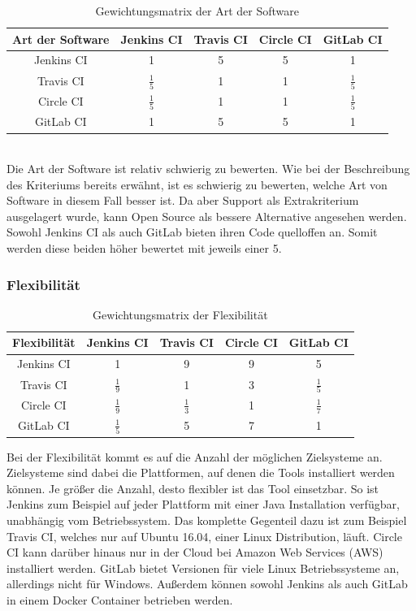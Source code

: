 \begin{table}[h!]
	\centering
	\begin{tabular}{c|cccc}
		Art der Software   & Jenkins CI		 & Travis CI& Circle CI & GitLab CI   \\ 
		\hline
		Jenkins CI      & 1     		      &       5       &     5      &      1    \\
		Travis CI &   $\frac{1}{5}$     & 1               &  1&$\frac{1}{5}$      \\
		Circle CI   &   $\frac{1}{5}$     &  1   & 1            & $\frac{1}{5}$  \\
		GitLab CI    &    1 		 &  5   &        5      & 1           \\
	\end{tabular}
	\caption{Gewichtungsmatrix der Art der Software}
\end{table}\\
Die Art der Software ist relativ schwierig zu bewerten. Wie bei der Beschreibung des Kriteriums bereits erwähnt, ist es schwierig zu bewerten, welche Art von Software in diesem Fall besser ist. Da aber Support als Extrakriterium ausgelagert wurde, kann Open Source als bessere Alternative angesehen werden. Sowohl Jenkins CI als auch GitLab bieten ihren Code quelloffen an. Somit werden diese beiden höher bewertet mit jeweils einer 5.
\subsubsection{Flexibilität}
\begin{table}[h!]
	\centering
	\begin{tabular}{c|cccc}
		Flexibilität   & Jenkins CI		 & Travis CI& Circle CI & GitLab CI   \\ 
		\hline
		Jenkins CI      & 1     		      &        9        &      9       &      5     \\
		Travis CI &   $\frac{1}{9}$     & 1               &  3&$\frac{1}{5}$      \\
		Circle CI   &   $\frac{1}{9}$     &  $\frac{1}{3}$   & 1            & $\frac{1}{7}$  \\
		GitLab CI    &    $\frac{1}{5}$    &  5   &       7      & 1           \\
	\end{tabular}
	\caption{Gewichtungsmatrix der Flexibilität}
\end{table}
Bei der Flexibilität kommt es auf die Anzahl der möglichen Zielsysteme an. Zielsysteme sind dabei die Plattformen, auf denen die Tools installiert werden können. Je größer die Anzahl, desto  flexibler ist das Tool einsetzbar. So ist Jenkins zum Beispiel auf jeder Plattform mit einer Java Installation verfügbar, unabhängig vom Betriebssystem. Das komplette Gegenteil dazu ist zum Beispiel Travis CI, welches nur auf Ubuntu 16.04, einer Linux Distribution, läuft. Circle CI kann darüber hinaus nur in der Cloud bei Amazon Web Services (AWS) installiert werden. GitLab bietet Versionen für viele Linux Betriebssysteme an, allerdings nicht für Windows. Außerdem können sowohl Jenkins als auch GitLab in einem Docker Container betrieben werden.
